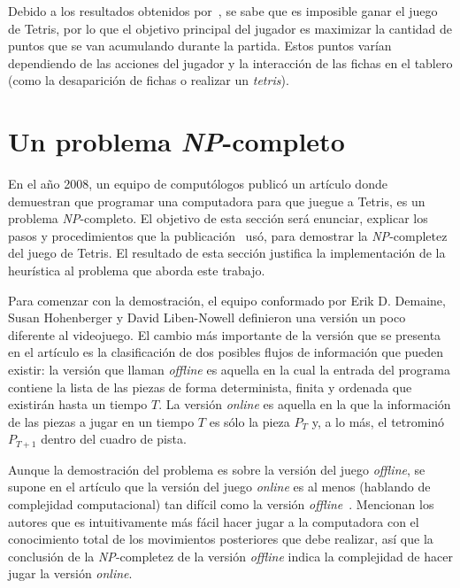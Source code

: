 Debido a los resultados obtenidos por~\cite{Burgiel97howto}, se sabe que es
imposible ganar el juego de Tetris, por lo que el objetivo principal del
jugador es maximizar la cantidad de puntos que se van acumulando durante la
partida. Estos puntos varían dependiendo de las acciones del jugador y la
interacción de las fichas en el tablero (como la desaparición de fichas o
realizar un \textit{tetris}).


\section{Un problema \textsl{NP}-completo}

En el año 2008, un equipo de computólogos publicó un artículo donde demuestran
que programar una computadora para que juegue a Tetris, es un problema \textsl{NP}-completo.
El objetivo de esta sección será enunciar, explicar los pasos y procedimientos
que la publicación~\cite{DBLP:journals/corr/cs-CC-0210020} usó, para demostrar
la \textsl{NP}-completez del juego de Tetris. El resultado de esta sección
justifica la implementación de la heurística al problema que aborda este
trabajo.

Para comenzar con la demostración, el equipo conformado por Erik D. Demaine,
Susan Hohenberger y David Liben-Nowell definieron una versión un poco diferente
al videojuego. El cambio más importante de la versión que se presenta en el artículo
es la clasificación de dos posibles flujos de información que pueden existir:
la versión que llaman \textit{offline} es aquella en la cual la entrada del programa
contiene la lista de las piezas de forma determinista, finita y ordenada que existirán
hasta un tiempo $T$. La versión \textit{online} es aquella en la que la
información de las piezas a jugar en un tiempo $T$ es sólo la pieza $P_{T}$
y, a lo más, el tetrominó $P_{T+1}$ dentro del cuadro de pista.

Aunque la demostración del problema es sobre la versión del juego
\textit{offline}, se supone en el artículo que la versión del juego \textit{online} es al menos
(hablando de complejidad computacional) tan difícil como la versión
\textit{offline}~\cite{DBLP:journals/corr/cs-CC-0210020,boumaza:hal-00926213}.
Mencionan los autores que es intuitivamente más fácil hacer jugar a la computadora con el conocimiento
total de los movimientos posteriores que debe realizar, así que la conclusión
de la \textsl{NP}-completez de la versión \textit{offline} indica la complejidad
de hacer jugar la versión \textit{online}.

